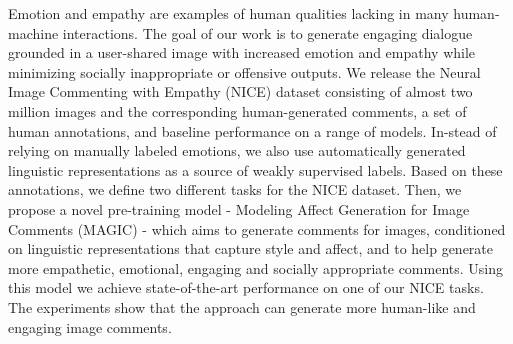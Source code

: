 Emotion and empathy are examples of human qualities lacking in many human-machine interactions.   The goal of our work is to generate  engaging  dialogue  grounded in a user-shared image with increased emotion and empathy while minimizing socially inappropriate or offensive outputs. We  release the Neural Image Commenting with Empathy (NICE) dataset consisting of almost two million  images and the corresponding human-generated comments,  a set of human annotations, and baseline performance on a range of models. In-stead of relying on manually labeled emotions, we also use  automatically generated linguistic representations as a source of weakly supervised labels. Based on  these  annotations, we define two different tasks for the NICE dataset. Then, we propose a novel pre-training model - Modeling Affect Generation for Image Comments (MAGIC) - which aims to generate comments for images, conditioned on linguistic representations that capture style and affect, and  to  help  generate  more  empathetic,  emotional, engaging and socially appropriate comments.  Using this model we achieve state-of-the-art performance on one of our NICE tasks. The experiments show that the approach can generate more human-like and engaging image comments.
